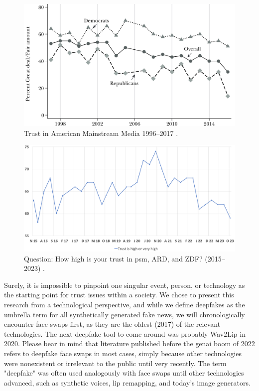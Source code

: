 \documentclass[
  a4paper,  %
  twoside,  %
  bibliography=totoc,
  headsepline,
  cleardoublepage=empty,
  parskip=half,
  draft=false
]{scrbook}
\begin{document}
\begin{figure}[h]
  \centering
  \centering
  \includegraphics[width=0.75\linewidth]{./graphics/trust-america mainstream.png}
  \caption{Trust in American Mainstream Media 1996–2017 \cite{allcottSocialMediaFake2017}.}
  \label{fig:trust-us}
\end{figure}
\begin{figure}[h]
  \centering
  \includegraphics[width=0.8\linewidth]{./graphics/FGW-Trust-in-ARDZDF.png}
  \caption{Question: How high is your trust in \gls{psm}, ARD, and ZDF? (2015–2023) \cite{zdf-politbarometerVertrauenGlaubwuerdigkeitBerichterstattung2023}.}
  \label{fig:trust-ger}
\end{figure}

Surely, it is impossible to pinpoint one singular event, person, or technology as the starting point for trust issues within a society. We chose to present this research from a technological perspective, and while we define deepfakes as the umbrella term for all synthetically generated fake news, we will chronologically encounter face swaps first, as they are the oldest (2017) of the relevant technologies. The next deepfake tool to come around was probably Wav2Lip in 2020. Please bear in mind that literature published before the \gls{genai} boom of 2022 refers to deepfake face swaps in most cases, simply because other technologies were nonexistent or irrelevant to the public until very recently. The term "deepfake" was often used analogously with face swaps until other technologies advanced, such as synthetic voices, lip remapping, and today's image generators.
\end{document}
